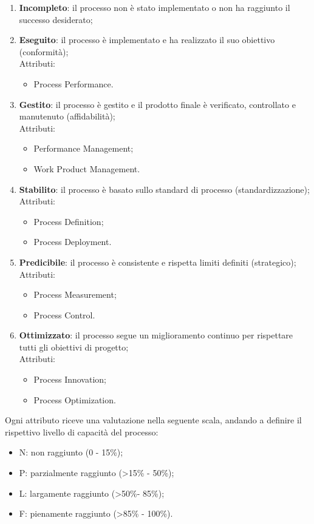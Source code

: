 \begin{enumerate}
	\item \textbf{Incompleto}: il processo non è stato implementato o non ha raggiunto il successo desiderato;
	\item \textbf{Eseguito}: il processo è implementato e ha realizzato il suo obiettivo (conformità);\\
	Attributi:
	\begin{itemize}
		\item Process Performance.
	\end{itemize}
	\item \textbf{Gestito}: il processo è gestito e il prodotto finale è verificato, controllato e manutenuto (affidabilità);\\
	Attributi:
	\begin{itemize}
		\item  Performance Management;
		\item  Work Product Management.
	\end{itemize}
	\item \textbf{Stabilito}: il processo è basato sullo standard di processo (standardizzazione);\\
	Attributi:
	\begin{itemize}
		\item  Process Definition;
		\item  Process Deployment.
	\end{itemize}
	\item \textbf{Predicibile}: il processo è consistente e rispetta limiti definiti (strategico);\\
	Attributi:
	\begin{itemize}
		\item  Process Measurement;
		\item  Process Control.
	\end{itemize}
	\item \textbf{Ottimizzato}: il processo segue un miglioramento continuo per rispettare tutti gli obiettivi di
progetto;\\
Attributi:
	\begin{itemize}
		\item  Process Innovation;
		\item  Process Optimization.
	\end{itemize}
\end{enumerate}

Ogni attributo riceve una valutazione nella seguente scala, andando a definire il rispettivo livello di
capacità del processo:
\begin{itemize}
	\item N: non raggiunto (0 - 15\%);
	\item P: parzialmente raggiunto (>15\% - 50\%);
	\item L: largamente raggiunto (>50\%- 85\%);
	\item F: pienamente raggiunto (>85\% - 100\%).
\end{itemize}


